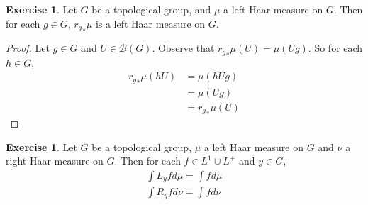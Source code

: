 \documentclass[12pt]{amsart}
\theoremstyle{definition}
\newtheorem{ex}[definition]{Exercise}
\newcommand{\MB}{\mathcal{B}}
\begin{document}
	\begin{ex}
		Let $G$ be a topological group, and $\mu$ a left Haar measure on $G$. Then for each $g \in G$, ${r_{g}}_*\mu$ is a left Haar measure on $G$.
	\end{ex}

	\begin{proof}
		Let $g \in G$ and $U \in \MB(G)$. Observe that ${r_{g}}_*\mu(U) = \mu(Ug)$. So for each $h \in G$, 
		\begin{align*}
			{r_{g}}_*\mu(hU) 
			& = \mu(hUg) \\
			& =  \mu(Ug) \\
			& = {r_{g}}_*\mu(U)
		\end{align*}
	\end{proof}
	
	\begin{ex}
		Let $G$ be a topological group, $\mu$ a left Haar measure on $G$ and $\nu$ a right Haar measure on $G$. Then for each $f \in L^1 \cup L^+$ and $y \in G$, 
		\begin{align}
			\int L_y f d\mu = \int f d\mu \\
			\int R_y f d\nu = \int f d\nu
		\end{align}
	\end{ex}
	
\end{document}
